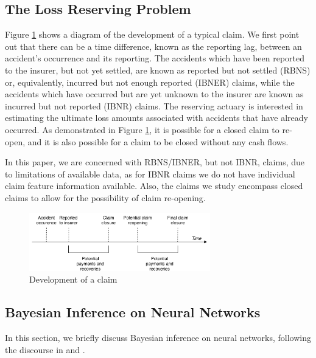 \documentclass{article}
\begin{document}
\subsection{The Loss Reserving Problem}

Figure \ref{fig:claimrunoff} shows a diagram of the development of a typical claim. We first point out that there can be a time difference, known as the reporting lag, between an accident's occurrence and its reporting. The accidents which have been reported to the insurer, but not yet settled, are known as reported but not settled (RBNS) or, equivalently, incurred but not enough reported (IBNER) claims, while the accidents which have occurred but are yet unknown to the insurer are known as incurred but not reported (IBNR) claims. The reserving actuary is interested in estimating the ultimate loss amounts associated with accidents that have already occurred. As demonstrated in Figure \ref{fig:claimrunoff}, it is possible for a closed claim to re-open, and it is also possible for a claim to be closed without any cash flows.

In this paper, we are concerned with RBNS/IBNER, but not IBNR, claims, due to limitations of available data, as for IBNR claims we do not have individual claim feature information available. Also, the claims we study encompass closed claims to allow for the possibility of claim re-opening.

\begin{figure}
  \begin{center}
    \includegraphics[width=0.7\textwidth]{images/claim_runoff.png}
  \end{center}
  \caption{Development of a claim}
  \label{fig:claimrunoff}
\end{figure}

\subsection{Bayesian Inference on Neural Networks} \label{section:bnn}

In this section, we briefly discuss Bayesian inference on neural networks, following the discourse in \cite{graves2011practical} and \cite{blundell2015weight}.
\end{document}
